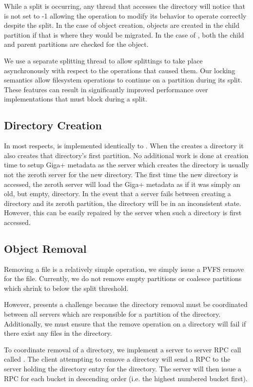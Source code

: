 \documentclass[onecolumn, 11pt, letterpaper]{article}
\begin{document}
While a split is occurring, any thread that accesses the directory will notice
that  is not set to -1 allowing the operation to
modify its behavior to operate correctly despite the split.  In the case of
object creation, objects are created in the child partition if that is where
they would be migrated.  In the case of , both the child and
parent partitions are checked for the object.

We use a separate splitting thread to allow splittings to take place
asynchronously with respect to the  operations that caused them.
Our locking semantics allow filesystem operations to continue on a partition
during its split.  These features can result in significantly improved
performance over implementations that must block during a split.

\subsection{Directory Creation}
In most respects,  is implemented identically to .
When the  creates a directory it also creates that
directory's first partition.  No additional work is done at creation time to
setup Giga+ metadata as the server which creates the directory is usually not
the zeroth server for the new directory.  The first time the new directory is
accessed, the zeroth server will load the Giga+ metadata as if it was simply
an old, but empty, directory.  In the event that a server fails between
creating a directory and its zeroth partition, the directory will be in an
inconsistent state.  However, this can be easily repaired by the server when
such a directory is first accessed.

\subsection{Object Removal}
Removing a file is a relatively simple operation, we simply issue a PVFS
remove for the file.  Currently, we do not remove empty partitions or
coalesce partitions which shrink to below the split threshold.

However,  presents a challenge because the directory removal must
be coordinated between all servers which are responsible for a partition of
the directory.  Additionally, we must ensure that the remove operation on a
directory will fail if there exist any files in the directory.

To coordinate removal of a directory, we implement a server to server RPC call
called .  The client attempting to remove a directory
will send a  RPC to the server holding the directory entry for
the directory.  The server will then issue a  RPC for
each bucket in descending order (i.e. the highest numbered bucket first).  
\end{document}
